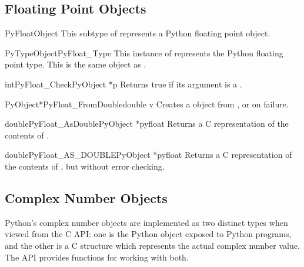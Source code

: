 \documentclass{manual}
\begin{document}
\subsection{Floating Point Objects \label{floatObjects}}

\begin{ctypedesc}{PyFloatObject}
This subtype of  represents a Python floating point
object.
\end{ctypedesc}

\begin{cvardesc}{PyTypeObject}{PyFloat_Type}
This instance of  represents the Python floating
point type.  This is the same object as .
\end{cvardesc}

\begin{cfuncdesc}{int}{PyFloat_Check}{PyObject *p}
Returns true if its argument is a .
\end{cfuncdesc}

\begin{cfuncdesc}{PyObject*}{PyFloat_FromDouble}{double v}
Creates a  object from , or \NULL{} on
failure.
\end{cfuncdesc}

\begin{cfuncdesc}{double}{PyFloat_AsDouble}{PyObject *pyfloat}
Returns a C  representation of the contents of .
\end{cfuncdesc}

\begin{cfuncdesc}{double}{PyFloat_AS_DOUBLE}{PyObject *pyfloat}
Returns a C  representation of the contents of
, but without error checking.
\end{cfuncdesc}


\subsection{Complex Number Objects \label{complexObjects}}

Python's complex number objects are implemented as two distinct types
when viewed from the C API:  one is the Python object exposed to
Python programs, and the other is a C structure which represents the
actual complex number value.  The API provides functions for working
with both.
\end{document}
